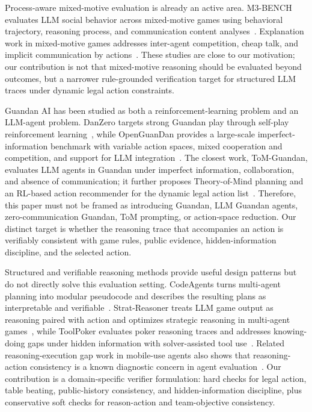 \documentclass[sigconf,anonymous,review]{acmart}
\begin{document}
Process-aware mixed-motive evaluation is already an active area. M3-BENCH evaluates LLM social behavior across mixed-motive games using behavioral trajectory, reasoning process, and communication content analyses~\citep{xie2026m3bench}. Explanation work in mixed-motive games addresses inter-agent competition, cheap talk, and implicit communication by actions~\citep{aaai2025mixedexplain}. These studies are close to our motivation; our contribution is not that mixed-motive reasoning should be evaluated beyond outcomes, but a narrower rule-grounded verification target for structured LLM traces under dynamic legal action constraints.

Guandan AI has been studied as both a reinforcement-learning problem and an LLM-agent problem. DanZero targets strong Guandan play through self-play reinforcement learning~\citep{lu2022danzero}, while OpenGuanDan provides a large-scale imperfect-information benchmark with variable action spaces, mixed cooperation and competition, and support for LLM integration~\citep{openguandan2026}. The closest work, ToM-Guandan, evaluates LLM agents in Guandan under imperfect information, collaboration, and absence of communication; it further proposes Theory-of-Mind planning and an RL-based action recommender for the dynamic legal action list~\citep{yim2024tomguandan}. Therefore, this paper must not be framed as introducing Guandan, LLM Guandan agents, zero-communication Guandan, ToM prompting, or action-space reduction. Our distinct target is whether the reasoning trace that accompanies an action is verifiably consistent with game rules, public evidence, hidden-information discipline, and the selected action.

Structured and verifiable reasoning methods provide useful design patterns but do not directly solve this evaluation setting. CodeAgents turns multi-agent planning into modular pseudocode and describes the resulting plans as interpretable and verifiable~\citep{yang2025codeagents}. Strat-Reasoner treats LLM game output as reasoning paired with action and optimizes strategic reasoning in multi-agent games~\citep{he2026stratreasoner}, while ToolPoker evaluates poker reasoning traces and addresses knowing-doing gaps under hidden information with solver-assisted tool use~\citep{lin2026toolpoker}. Related reasoning-execution gap work in mobile-use agents also shows that reasoning-action consistency is a known diagnostic concern in agent evaluation~\citep{ma2025saydo}. Our contribution is a domain-specific verifier formulation: hard checks for legal action, table beating, public-history consistency, and hidden-information discipline, plus conservative soft checks for reason-action and team-objective consistency.
\end{document}
